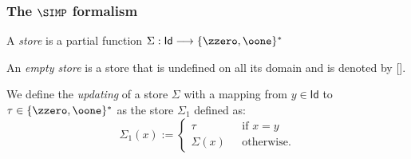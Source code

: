 \subsubsection{The $\SIMP$ formalism}
\label{sec:simp:app}

\begin{defn}[Store]
A \emph{store} is a partial function
$\Sigma:\mathsf{Id} \longrightarrow {\{\zzero,\oone\}^*}$
\end{defn}


\begin{defn}
An \emph{empty store} is a store
that is undefined on all its
domain and is denoted by [].
\end{defn}



\begin{defn}[Updating]
We define the \emph{updating}
of a store $\Sigma$ with a mapping
from $y\in \mathsf{Id}$
to {$\tau\in\{\zzero,\oone\}^*$}
as the store $\Sigma_1$ defined as:
$$
\Sigma_1(x) :=
\begin{cases}
\tau \ \ \ &\text{if } x=y \\
\Sigma(x) \ \ \ &\text{otherwise.}
\end{cases}
$$
\end{defn}




